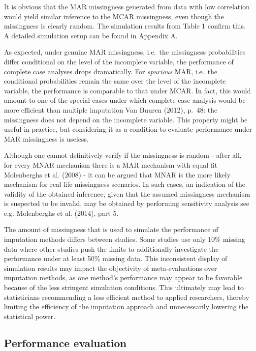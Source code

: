 \documentclass[
]{article}
\begin{document}
It is obvious that the MAR missingness generated from data with low
correlation would yield similar inference to the MCAR missingness, even
though the missingness is clearly random. The simulation results from
Table 1 confirm this. A detailed simulation setup can be found in
Appendix A.

As expected, under genuine MAR missingness, i.e.~the missingness
probabilities differ conditional on the level of the incomplete
variable, the performance of complete case analyses drops dramatically.
For \emph{spurious} MAR, i.e.~the conditional probabilities remain the
same over the level of the incomplete variable, the performance is
comparable to that under MCAR. In fact, this would amount to one of the
special cases under which complete case analysis would be more efficient
than multiple imputation Van Buuren (2012), p.~48: the missingness does
not depend on the incomplete variable. This property might be useful in
practice, but considering it as a condition to evaluate performance
under MAR missingness is useless.

Although one cannot definitively verify if the missingness is random -
after all, for every MNAR mechanism there is a MAR mechanism with equal
fit Molenberghs et al. (2008) - it can be argued that MNAR is the more
likely mechanism for real life missingness scenarios. In such cases, an
indication of the validity of the obtained inference, given that the
assumed missingness mechanism is suspected to be invalid, may be
obtained by performing sensitivity analysis see e.g. Molenberghs et al.
(2014), part 5.

The amount of missingness that is used to simulate the performance of
imputation methods differs between studies. Some studies use only 10\%
missing data where other studies push the limits to additionally
investigate the performance under at least 50\% missing data. This
inconsistent display of simulation results may impact the objectivity of
meta-evaluations over imputation methods, as one method's performance
may appear to be favorable because of the less stringent simulation
conditions. This ultimately may lead to statisticians recommending a
less efficient method to applied researchers, thereby limiting the
efficiency of the imputation approach and unnecessarily lowering the
statistical power.

\hypertarget{performance-evaluation}{%
\subsection{Performance evaluation}\label{performance-evaluation}}
\end{document}
